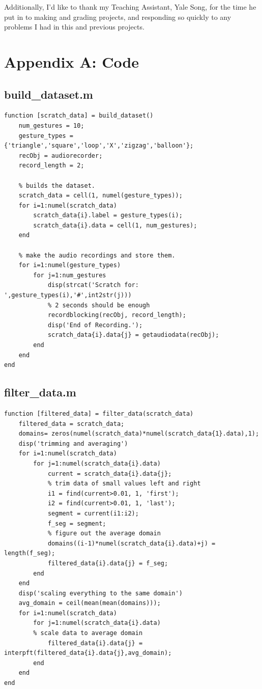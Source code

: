 \documentclass[12pt]{article}
\begin{document}
Additionally, I'd like to thank my Teaching Assistant, Yale Song, for the time he put in to making and grading projects, and responding so quickly to any problems I had in this and previous projects.

\section{Appendix A: Code}

\subsection{build\_dataset.m}

\begin{verbatim}
function [scratch_data] = build_dataset()
    num_gestures = 10;
    gesture_types = {'triangle','square','loop','X','zigzag','balloon'};
    recObj = audiorecorder;
    record_length = 2;
    
    % builds the dataset.
    scratch_data = cell(1, numel(gesture_types));
    for i=1:numel(scratch_data)
        scratch_data{i}.label = gesture_types(i);
        scratch_data{i}.data = cell(1, num_gestures);
    end
    
    % make the audio recordings and store them.
    for i=1:numel(gesture_types)
        for j=1:num_gestures
            disp(strcat('Scratch for: ',gesture_types(i),'#',int2str(j)))
            % 2 seconds should be enough
            recordblocking(recObj, record_length);
            disp('End of Recording.');
            scratch_data{i}.data{j} = getaudiodata(recObj);
        end
    end
end
\end{verbatim}

\subsection{filter\_data.m}

\begin{verbatim}
function [filtered_data] = filter_data(scratch_data)
    filtered_data = scratch_data;
    domains= zeros(numel(scratch_data)*numel(scratch_data{1}.data),1);
    disp('trimming and averaging')
    for i=1:numel(scratch_data)
        for j=1:numel(scratch_data{i}.data)
            current = scratch_data{i}.data{j};
            % trim data of small values left and right
            i1 = find(current>0.01, 1, 'first');
            i2 = find(current>0.01, 1, 'last');
            segment = current(i1:i2);
            f_seg = segment;
            % figure out the average domain
            domains((i-1)*numel(scratch_data{i}.data)+j) = length(f_seg);
            filtered_data{i}.data{j} = f_seg;
        end
    end
    disp('scaling everything to the same domain')    
    avg_domain = ceil(mean(mean(domains)));
    for i=1:numel(scratch_data)
        for j=1:numel(scratch_data{i}.data)
        % scale data to average domain
            filtered_data{i}.data{j} = interpft(filtered_data{i}.data{j},avg_domain);
        end
    end
end
\end{verbatim}
\end{document}
